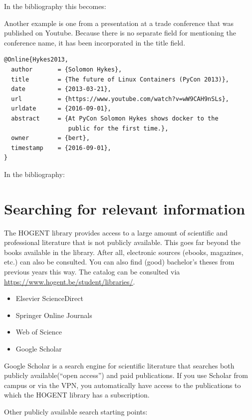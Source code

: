 In the bibliography this becomes: 

Another example is one from a presentation at a trade conference that was published on Youtube. Because there is no separate field for mentioning the conference name, it has been incorporated in the title field.

\begin{verbatim}
@Online{Hykes2013,
  author       = {Solomon Hykes},
  title        = {The future of Linux Containers (PyCon 2013)},
  date         = {2013-03-21},
  url          = {https://www.youtube.com/watch?v=wW9CAH9nSLs},
  urldate      = {2016-09-01},
  abstract     = {At PyCon Solomon Hykes shows docker to the
                  public for the first time.},
  owner        = {bert},
  timestamp    = {2016-09-01},
}
\end{verbatim}

In the bibliography: 

\section{Searching for relevant information}
\label{sec:Searching_for_relevant_information}

The HOGENT library provides access to a large amount of scientific and professional literature that is not publicly available. This goes far beyond the books available in the library. After all, electronic sources (ebooks, magazines, etc.) can also be consulted. You can also find (good) bachelor's theses from previous years this way. The catalog can be consulted via \url{https://www.hogent.be/student/libraries/}.

\begin{itemize}
  \item Elsevier ScienceDirect
  \item Springer Online Journals
  \item Web of Science
  \item Google Scholar
\end{itemize}

Google Scholar is a search engine for scientific literature that searches both publicly available(``open access'') and paid publications. If you use Scholar from campus or via the VPN, you automatically have access to the publications to which the HOGENT library has a subscription.

Other publicly available search starting points:

